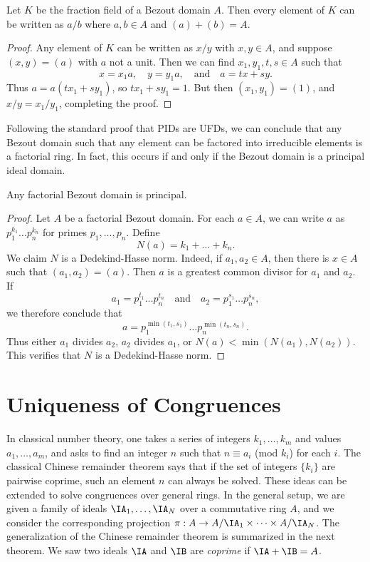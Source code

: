 \begin{lemma}
    Let $K$ be the fraction field of a Bezout domain $A$. Then every element of $K$ can be written as $a/b$ where $a,b \in A$ and $(a) + (b) = A$.
\end{lemma}
\begin{proof}
    Any element of $K$ can be written as $x/y$ with $x,y \in A$, and suppose $(x,y) = (a)$ with $a$ not a unit. Then we can find $x_1,y_1,t,s \in A$ such that
    \[ x = x_1a,\quad y = y_1a,\quad\text{and}\quad a = tx + sy. \]
    Thus $a = a(tx_1 + sy_1)$, so $tx_1 + sy_1 = 1$. But then $(x_1,y_1) = (1)$, and $x/y=x_1/y_1$, completing the proof.
\end{proof}

Following the standard proof that PIDs are UFDs, we can conclude that any Bezout domain such that any element can be factored into irreducible elements is a factorial ring. In fact, this occurs if and only if the Bezout domain is a principal ideal domain.

\begin{lemma}
    Any factorial Bezout domain is principal.
\end{lemma}
\begin{proof}
    Let $A$ be a factorial Bezout domain. For each $a \in A$, we can write $a$ as $p_1^{k_1} \dots p_n^{k_n}$ for primes $p_1, \dots, p_n$. Define
    \[ N(a) = k_1 + \dots + k_n. \]
    We claim $N$ is a Dedekind-Hasse norm. Indeed, if $a_1,a_2 \in A$, then there is $x \in A$ such that $(a_1,a_2) = (a)$. Then $a$ is a greatest common divisor for $a_1$ and $a_2$. If
    \[ a_1 = p_1^{t_1} \dots p_n^{t_n} \quad\text{and}\quad a_2 = p_1^{s_1} \dots p_n^{s_n}, \]
    we therefore conclude that
    \[ a = p_1^{\min(t_1,s_1)} \dots p_n^{\min(t_n,s_n)}. \]
    Thus either $a_1$ divides $a_2$, $a_2$ divides $a_1$, or $N(a) < \min(N(a_1),N(a_2))$. This verifies that $N$ is a Dedekind-Hasse norm.
\end{proof}

\section{Uniqueness of Congruences}

In classical number theory, one takes a series of integers $k_1, \dots, k_m$ and values $a_1, \dots, a_m$, and asks to find an integer $n$ such that $n \equiv a_i$ (mod $k_i$) for each $i$. The classical Chinese remainder theorem says that if the set of integers $\{ k_i \}$ are pairwise coprime, such an element $n$ can always be solved. These ideas can be extended to solve congruences over general rings. In the general setup, we are given a family of ideals $\IA_1, \dots, \IA_N$ over a commutative ring $A$, and we consider the corresponding projection $\pi: A \to A/\IA_1 \times \dots \times A/\IA_N$. The generalization of the Chinese remainder theorem is summarized in the next theorem. We saw two ideals $\IA$ and $\IB$ are \emph{coprime} if $\IA + \IB = A$.

